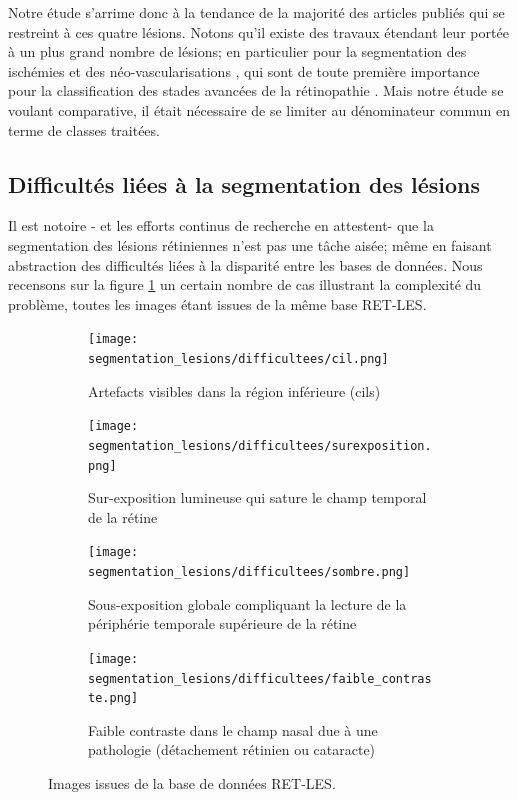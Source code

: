 Notre étude s'arrime donc à la tendance de la majorité des articles publiés qui se restreint à ces quatre lésions. Notons qu'il existe des travaux étendant leur portée à un plus grand nombre de lésions; en particulier pour la segmentation des ischémies et des néo-vascularisations \cite{weiLearnSegmentRetinal2021}, qui sont de toute première importance pour la classification des stades avancées de la rétinopathie \cite{boucherEvidencebasedCanadianGuidelines2020}. Mais notre étude se voulant comparative, il était nécessaire de se limiter au dénominateur commun en terme de classes traitées.


\subsection{Difficultés liées à la segmentation des lésions}
\label{sec:segmentationDifficulte}
Il est notoire - et les efforts continus de recherche en attestent- que la segmentation des lésions rétiniennes n'est pas une tâche aisée; même en faisant abstraction des difficultés liées à la disparité entre les bases de données. Nous recensons sur la figure \ref{fig:DifficultesAcquisition} un certain nombre de cas illustrant la complexité du problème, toutes les images étant issues de la même base RET-LES.  
\begin{figure}
	\begin{subfigure}[t]{.5\textwidth}
		\texttt{[image: segmentation\_lesions/difficultees/cil.png]}
		\caption{Artefacts visibles dans la région inférieure (cils)}
	\end{subfigure}
	\begin{subfigure}[t]{.5\textwidth}
		\texttt{[image: segmentation\_lesions/difficultees/surexposition.png]}
		\caption{Sur-exposition lumineuse qui sature le champ temporal de la rétine}
	\end{subfigure}
	\begin{subfigure}[t]{.5\textwidth}
		\texttt{[image: segmentation\_lesions/difficultees/sombre.png]}
		\caption{Sous-exposition globale compliquant la lecture de la périphérie temporale supérieure de la rétine}
	\end{subfigure}
	\begin{subfigure}[t]{.5\textwidth}
		\texttt{[image: segmentation\_lesions/difficultees/faible\_contraste.png]}
		\caption{Faible contraste dans le champ nasal due à une pathologie (détachement rétinien ou cataracte)}
	\end{subfigure}
\caption{Images issues de la base de données RET-LES.}
\label{fig:DifficultesAcquisition}
\end{figure}

